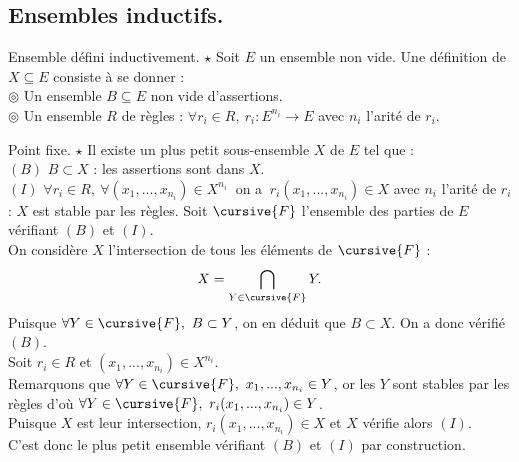 \documentclass[french, 11pt]{article}
\begin{document}
\subsection{Ensembles inductifs.}{}

\begin{defi}{Ensemble défini inductivement. $\star$}{}
    Soit $E$ un ensemble non vide. Une définition de $X \subseteq E$ consiste à se donner :\\
    \hspace*{2em}$\circledcirc$ Un ensemble $B\subseteq E$ non vide d'assertions.\\
    \hspace*{2em}$\circledcirc$ Un ensemble $R$ de règles : $\forall r_i \in R, ~ r_i : E^{n_i} \to E$ avec $n_i$ l'arité de $r_i$.
\end{defi}

\begin{thm}{Point fixe. $\star$}{}
    Il existe un plus petit sous-ensemble $X$ de $E$ tel que :\\
    \hspace*{2em}$(B)$ $B \subset X$ : les assertions sont dans $X$.\\
    \hspace*{2em}$(I)$ $\forall r_i \in R, ~ \forall (x_1, ..., x_{n_i}) \in X^{n_i} ~ $ on a $ ~ r_i(x_1,...,x_{n_i})\in X$ avec $n_i$ l'arité de $r_i$ : $X$ est stable par les règles.
    \tcblower
    Soit $\cursive{F}$ l'ensemble des parties de $E$ vérifiant $(B)$ et $(I)$.\\
    On considère $X$ l'intersection de tous les éléments de $\cursive{F}$ :
    \begin{equation*}
        X = \bigcap_{Y\in\cursive{F}}Y.
    \end{equation*}
    Puisque $\forall Y\in \cursive{F}, ~ B\subset Y$, on en déduit que $B \subset X$. On a donc vérifié $(B)$.\\
    Soit $r_i\in R$ et $(x_1, ..., x_{n_i})\in X^{n_i}$.\\
    Remarquons que $\forall Y \in \cursive{F}, ~ x_1, ..., x_{n_i} \in Y$, or les $Y$ sont stables par les règles d'où $\forall Y \in \cursive{F}, ~ r_i(x_1, ..., x_{n_i})\in Y$.\\
    Puisque $X$ est leur intersection, $r_i(x_1, ..., x_{n_i})\in X$ et $X$ vérifie alors $(I)$.\\
    C'est donc le plus petit ensemble vérifiant $(B)$ et $(I)$ par construction.
\end{thm}
\end{document}
